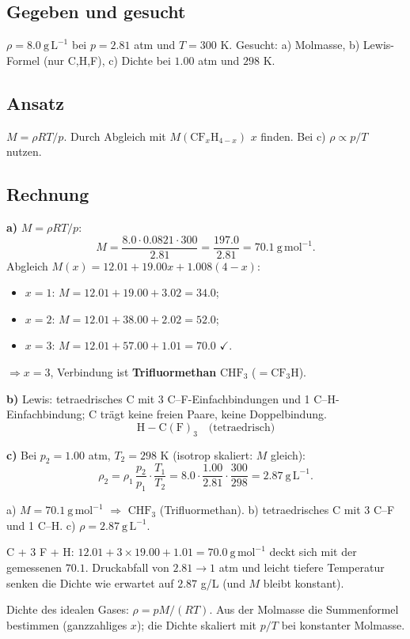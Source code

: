 
\subsection*{Gegeben und gesucht}
$\rho = 8.0\ \mathrm{g\,L^{-1}}$ bei $p=2.81$ atm und $T=300$ K.
Gesucht: a) Molmasse, b) Lewis-Formel (nur C,H,F), c) Dichte bei $1.00$ atm
und $298$ K.

\subsection*{Ansatz}
$M=\rho RT/p$. Durch Abgleich mit $M(\mathrm{CF}_x\mathrm{H}_{4-x})$
$x$ finden. Bei c) $\rho\propto p/T$ nutzen.

\subsection*{Rechnung}
\textbf{a)} $M=\rho RT/p$:
\[
  M = \frac{8.0\cdot 0.0821\cdot 300}{2.81}
    = \frac{197.0}{2.81} = 70.1\ \mathrm{g\,mol^{-1}} .
\]
Abgleich $M(x)=12.01+19.00x+1.008(4-x)$:
\begin{itemize}
  \item $x=1$: $M=12.01+19.00+3.02 = 34.0$;
  \item $x=2$: $M=12.01+38.00+2.02 = 52.0$;
  \item $x=3$: $M=12.01+57.00+1.01 = 70.0$ $\checkmark$.
\end{itemize}
$\Rightarrow x=3$, Verbindung ist \textbf{Trifluormethan} $\mathrm{CHF_3}$
($= \mathrm{CF_3H}$).

\textbf{b)} Lewis: tetraedrisches C mit 3 C--F-Einfachbindungen und
1 C--H-Einfachbindung; C tr\"agt keine freien Paare, keine Doppelbindung.
\[
  \mathrm{H{-}C(F)_3}\quad\text{(tetraedrisch)}
\]

\textbf{c)} Bei $p_2=1.00$ atm, $T_2=298$ K (isotrop skaliert:
$M$ gleich):
\[
  \rho_2 = \rho_1\,\frac{p_2}{p_1}\cdot\frac{T_1}{T_2}
  = 8.0\cdot\frac{1.00}{2.81}\cdot\frac{300}{298}
  = 2.87\ \mathrm{g\,L^{-1}} .
\]

\begin{ergebnis}
a) $M=70.1\ \mathrm{g\,mol^{-1}}$ $\Rightarrow$ $\mathrm{CHF_3}$
(Trifluormethan). b) tetraedrisches C mit 3 C--F und 1 C--H.
c) $\rho=2.87\ \mathrm{g\,L^{-1}}$.
\end{ergebnis}

\begin{kontrolle}
C + 3 F + H: $12.01+3\times 19.00+1.01 = 70.0\ \mathrm{g\,mol^{-1}}$ deckt
sich mit der gemessenen $70.1$. Druckabfall von $2.81\to1$ atm und leicht
tiefere Temperatur senken die Dichte wie erwartet auf $2.87$ g/L
(und $M$ bleibt konstant).
\end{kontrolle}

\begin{merksatz}
Dichte des idealen Gases: $\rho=pM/(RT)$. Aus der Molmasse die
Summenformel bestimmen (ganzzahliges $x$); die Dichte skaliert mit
$p/T$ bei konstanter Molmasse.
\end{merksatz}
